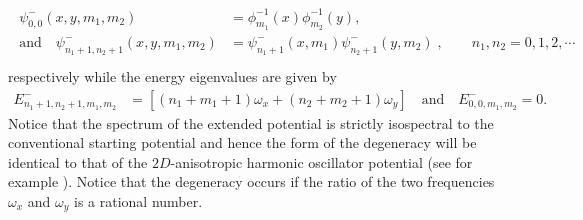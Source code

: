 \documentclass[12pt]{article}
\numberwithin{equation}{section} %
\begin{document}
\begin{align} \label{2D:psi-}
    \begin{split}
        \psi^-_{0,0}(x,y,m_1,m_2)&=\phi_{m_1}^{-1}(x)\phi_{m_2}^{-1}(y), \\
        \mbox{and} \quad  \psi^-_{n_1+1,n_2+1}(x,y,m_1,m_2)&=\psi^-_{n_1+1}(x,m_1)\psi^-_{n_2+1}(y,m_2)\;,\qquad n_1,n_2=0,1,2,\cdots\\
    \end{split}
\end{align}
respectively while the energy eigenvalues are given by
\begin{align}
 E_{n_1+1,n_2+1,m_1,m_2}^-&=\left[\left(n_1+m_1+1\right)\omega_x
+\left(n_2+m_2+1\right)\omega_y \right] \quad \text{and}
\quad E_{0,0,m_1,m_2}^-=0.
\end{align}
Notice that the spectrum of the extended potential is strictly isospectral to the conventional starting potential and hence the form of the degeneracy will be identical to that of the $2D$-anisotropic harmonic oscillator potential (see for example \cite{louck1973canonical}). Notice that the degeneracy occurs if the ratio of the two frequencies $\omega_x$ and $\omega_y$ is a rational number. 
\end{document}
